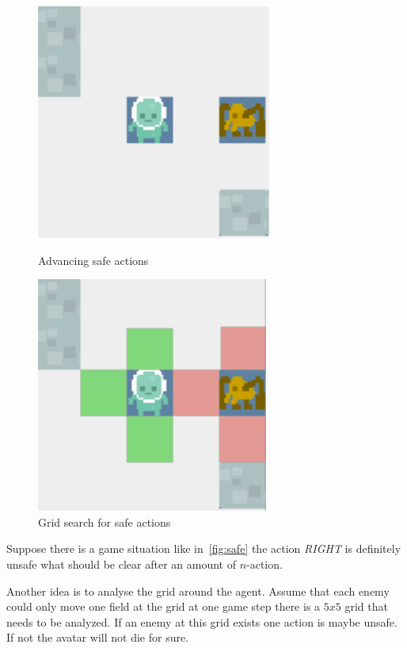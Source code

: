 \begin{figure}
\centering
\begin{minipage}{.5\textwidth}
  \centering
\includegraphics[scale=0.8]{images/safe.pdf}
\caption{Advancing safe actions}
\label{fig:safe}
\end{minipage}%
\begin{minipage}{.5\textwidth}
\centering
\includegraphics[scale=0.8]{images/safe_grid.pdf}
\caption{Grid search for safe actions}
\label{fig:safe_grid}
\end{minipage}
\end{figure}



Suppose there is a game situation like in~\cref{fig:safe} the action \textit{RIGHT} is definitely unsafe what 
should be clear after an amount of $n$-action.

Another idea is to analyse the grid around the agent. Assume that each enemy could only move one field at the grid
at one game step there is a $5x5$ grid that needs to be analyzed. If an enemy at this grid exists one action is
maybe unsafe. If not the avatar will not die for sure.




